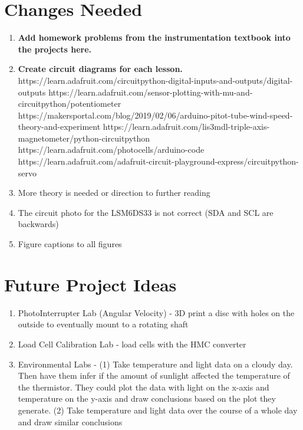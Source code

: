 \section{Changes Needed}
\begin{enumerate}[itemsep=-5pt]
\item {\bf Add homework problems from the instrumentation textbook into the projects here.}
\item {\bf Create circuit diagrams for each lesson.}
https://learn.adafruit.com/circuitpython-digital-inputs-and-outputs/digital-outputs
https://learn.adafruit.com/sensor-plotting-with-mu-and-circuitpython/potentiometer
https://makersportal.com/blog/2019/02/06/arduino-pitot-tube-wind-speed-theory-and-experiment
https://learn.adafruit.com/lis3mdl-triple-axis-magnetometer/python-circuitpython
https://learn.adafruit.com/photocells/arduino-code
https://learn.adafruit.com/adafruit-circuit-playground-express/circuitpython-servo
\item More theory is needed or direction to further reading 
\item The circuit photo for the LSM6DS33 is not correct (SDA and SCL are backwards)
\item Figure captions to all figures
\end{enumerate}

\section{Future Project Ideas}
\begin{enumerate}[itemsep=-5pt]
\item PhotoInterrupter Lab (Angular Velocity) - 3D print a disc with holes on the outside to eventually mount to a rotating shaft  
\item Load Cell Calibration Lab - load cells with the HMC converter
\item Environmental Labs - (1) Take temperature and light data on a cloudy day. Then have them infer if the amount of sunlight affected the temperature of the thermistor. They could plot the data with light on the x-axis and temperature on the y-axis and draw conclusions based on the plot they generate. (2) Take temperature and light data over the course of a whole day and draw similar conclusions
\end{enumerate}
